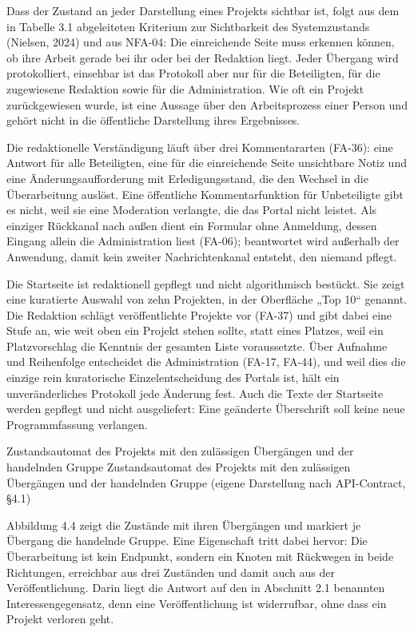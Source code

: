 Dass der Zustand an jeder Darstellung eines Projekts sichtbar ist, folgt aus dem in Tabelle 3.1 abgeleiteten Kriterium zur Sichtbarkeit des Systemzustands (Nielsen, 2024) und aus NFA-04: Die einreichende Seite muss erkennen können, ob ihre Arbeit gerade bei ihr oder bei der Redaktion liegt. Jeder Übergang wird protokolliert, einsehbar ist das Protokoll aber nur für die Beteiligten, für die zugewiesene Redaktion sowie für die Administration. Wie oft ein Projekt zurückgewiesen wurde, ist eine Aussage über den Arbeitsprozess einer Person und gehört nicht in die öffentliche Darstellung ihres Ergebnisses.

Die redaktionelle Verständigung läuft über drei Kommentararten (FA-36): eine Antwort für alle Beteiligten, eine für die einreichende Seite unsichtbare Notiz und eine Änderungsaufforderung mit Erledigungsstand, die den Wechsel in die Überarbeitung auslöst. Eine öffentliche Kommentarfunktion für Unbeteiligte gibt es nicht, weil sie eine Moderation verlangte, die das Portal nicht leistet. Als einziger Rückkanal nach außen dient ein Formular ohne Anmeldung, dessen Eingang allein die Administration liest (FA-06); beantwortet wird außerhalb der Anwendung, damit kein zweiter Nachrichtenkanal entsteht, den niemand pflegt.

Die Startseite ist redaktionell gepflegt und nicht algorithmisch bestückt. Sie zeigt eine kuratierte Auswahl von zehn Projekten, in der Oberfläche „Top 10“ genannt. Die Redaktion schlägt veröffentlichte Projekte vor (FA-37) und gibt dabei eine Stufe an, wie weit oben ein Projekt stehen sollte, statt eines Platzes, weil ein Platzvorschlag die Kenntnis der gesamten Liste voraussetzte. Über Aufnahme und Reihenfolge entscheidet die Administration (FA-17, FA-44), und weil dies die einzige rein kuratorische Einzelentscheidung des Portals ist, hält ein unveränderliches Protokoll jede Änderung fest. Auch die Texte der Startseite werden gepflegt und nicht ausgeliefert: Eine geänderte Überschrift soll keine neue Programmfassung verlangen.

%
{Zustandsautomat des Projekts mit den zulässigen Übergängen und der handelnden Gruppe}%
{Zustandsautomat des Projekts mit den zulässigen Übergängen und der handelnden Gruppe (eigene Darstellung nach API-Contract, §4.1)}

Abbildung 4.4 zeigt die Zustände mit ihren Übergängen und markiert je Übergang die handelnde Gruppe. Eine Eigenschaft tritt dabei hervor: Die Überarbeitung ist kein Endpunkt, sondern ein Knoten mit Rückwegen in beide Richtungen, erreichbar aus drei Zuständen und damit auch aus der Veröffentlichung. Darin liegt die Antwort auf den in Abschnitt 2.1 benannten Interessengegensatz, denn eine Veröffentlichung ist widerrufbar, ohne dass ein Projekt verloren geht.

